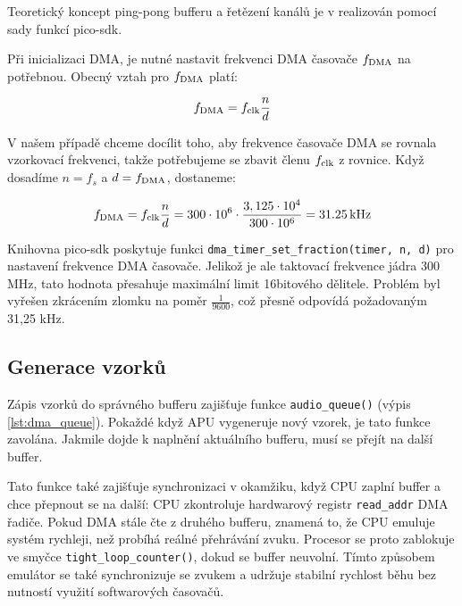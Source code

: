 Teoretický koncept ping-pong bufferu a řetězení kanálů je v realizován pomocí sady funkcí pico-sdk.

Při inicializaci DMA, je nutné nastavit frekvenci DMA časovače $f_{\text{DMA}}$ na potřebnou.
Obecný vztah pro $f_{\text{DMA}}$ platí:

$$
f_{\text{DMA}} = f_{\text{clk}} \frac{n}{d}
$$

V našem případě chceme docílit toho, aby frekvence časovače DMA se rovnala vzorkovací frekvenci,
takže potřebujeme se zbavit členu $f_{\text{clk}}$ z rovnice. Když dosadíme $n = f_s$ a $d =
f_{\text{DMA}}$, dostaneme:

$$
f_{\text{DMA}} = f_{\text{clk}} \frac{n}{d} = 300 \cdot 10^6 \cdot \frac{3,125 \cdot 10^4}{300
\cdot 10^6} = \SI{31,25}{kHz}
$$

Knihovna pico-sdk poskytuje funkci \texttt{dma\_timer\_set\_fraction(timer, n, d)} pro nastavení
frekvence DMA časovače. Jelikož je ale taktovací frekvence jádra 300 MHz, tato hodnota přesahuje
maximální limit 16bitového dělitele. Problém byl vyřešen zkrácením zlomku na poměr
$\frac{1}{9600}$, což přesně odpovídá požadovaným 31,25 kHz.

\subsection{Generace vzorků}

Zápis vzorků do správného bufferu zajišťuje funkce \texttt{audio\_queue()} (výpis
\ref{lst:dma_queue}). Pokaždé když APU vygeneruje nový vzorek, je tato funkce zavolána. Jakmile
dojde k naplnění aktuálního bufferu, musí se přejít na další buffer.

Tato funkce také zajišťuje synchronizaci v okamžiku, když CPU zaplní buffer a chce přepnout se na
další: CPU zkontroluje hardwarový registr \texttt{read\_addr} DMA řadiče. Pokud DMA stále čte z
druhého bufferu, znamená to, že CPU emuluje systém rychleji, než probíhá reálné přehrávání zvuku.
Procesor se proto zablokuje ve smyčce \texttt{tight\_loop\_counter()}, dokud se buffer neuvolní.
Tímto způsobem emulátor se také synchronizuje se zvukem a udržuje stabilní rychlost běhu bez
nutností využití softwarových časovačů.

